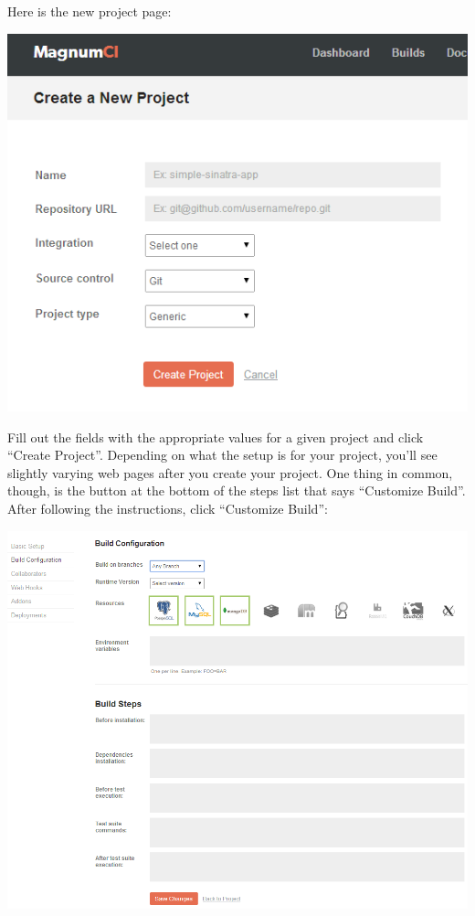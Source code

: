 \documentclass[12pt]{ucthesis}
\newenvironment{Figure}
  {\par\medskip\noindent\minipage{\linewidth}}
  {\endminipage\par\medskip}
\begin{document}
Here is the new project page:
\begin{Figure}
  \centering
  \includegraphics[width=0.75\linewidth]{magnumCI_new_project.png}
\end{Figure}

Fill out the fields with the appropriate values for a given project and click ``Create Project''. Depending on what the setup is for your project, you'll see slightly varying web pages after you create your project. One thing in common, though, is the button at the bottom of the steps list that says ``Customize Build''. After following the instructions, click ``Customize Build'':
\begin{Figure}
  \centering
  \includegraphics[width=0.75\linewidth]{magnumCI_customize_build.png}
\end{Figure}
\end{document}
